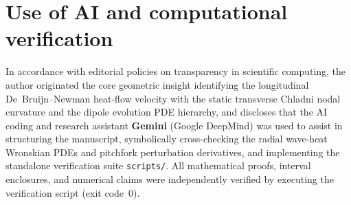 \documentclass[11pt,reqno]{amsart}
\theoremstyle{definition}
\theoremstyle{remark}
\numberwithin{equation}{section}
\begin{document}
\section*{Use of AI and computational verification}

{\sloppy
In accordance with editorial policies on transparency in scientific computing, the author originated the core geometric insight identifying the longitudinal De~Bruijn--Newman heat-flow velocity with the static transverse Chladni nodal curvature and the dipole evolution PDE hierarchy, and discloses that the AI coding and research assistant \textbf{Gemini} (Google DeepMind) was used to assist in structuring the manuscript, symbolically cross-checking the radial wave-heat Wronskian PDEs and pitchfork perturbation derivatives, and implementing the standalone verification suite \texttt{scripts/}\allowbreak\texttt{}. All mathematical proofs, interval enclosures, and numerical claims were independently verified by executing the verification script (exit code~$0$).\par}
\end{document}
